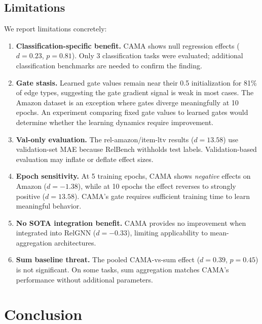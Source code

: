\documentclass[11pt,letterpaper]{article}
\begin{document}
\subsection{Limitations}
\label{sec:limitations}

We report limitations concretely:

\begin{enumerate}
    \item \textbf{Classification-specific benefit.} CAMA shows null regression effects ($d = 0.23$, $p = 0.81$). Only 3 classification tasks were evaluated; additional classification benchmarks are needed to confirm the finding.

    \item \textbf{Gate stasis.} Learned gate values remain near their 0.5 initialization for 81\% of edge types, suggesting the gate gradient signal is weak in most cases. The Amazon dataset is an exception where gates diverge meaningfully at 10 epochs. An experiment comparing fixed gate values to learned gates would determine whether the learning dynamics require improvement.

    \item \textbf{Val-only evaluation.} The rel-amazon/item-ltv results ($d = 13.58$) use validation-set MAE because RelBench withholds test labels. Validation-based evaluation may inflate or deflate effect sizes.

    \item \textbf{Epoch sensitivity.} At 5 training epochs, CAMA shows \emph{negative} effects on Amazon ($d = -1.38$), while at 10 epochs the effect reverses to strongly positive ($d = 13.58$). CAMA's gate requires sufficient training time to learn meaningful behavior.

    \item \textbf{No SOTA integration benefit.} CAMA provides no improvement when integrated into RelGNN \citep{Chen2025} ($d = -0.33$), limiting applicability to mean-aggregation architectures.

    \item \textbf{Sum baseline threat.} The pooled CAMA-vs-sum effect ($d = 0.39$, $p = 0.45$) is not significant. On some tasks, sum aggregation matches CAMA's performance without additional parameters.
\end{enumerate}


\section{Conclusion}
\label{sec:conclusion}
\end{document}
